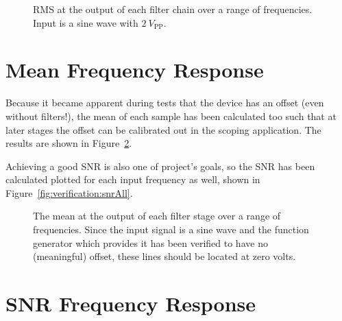 \begin{figure}
    \centering
    
    \caption[RMS at Filter Chain Output]{%
        RMS  at   the  output   of  each   filter  chain   over  a   range  of
        frequencies. Input is a sine wave with $\SI{2}{V_{\mathrm{PP}}}$.%
    }
    \label{fig:verification:rmsAll}
\end{figure}


%
%
\section{Mean Frequency Response} %
\label{sec:verification:mean}

Because it  became apparent during tests  that the device has  an offset (even
without filters!), the  mean of each sample has been  calculated too such that
at later stages  the offset can be calibrated out  in the scoping application.
The results are shown in Figure~\ref{fig:verification:meanAll}.

Achieving  a  good  SNR is  also  one  of  project's  goals, so  the  SNR  has
been  calculated  plotted   for  each  input  frequency  as   well,  shown  in
Figure~\ref{fig:verification:snrAll}.

\begin{figure}
    \centering
    
    \caption[Mean at Filter Outputs]{%
        The  mean  at  the  output  of  each filter  stage  over  a  range  of
        frequencies.  Since the  input signal is a sine wave  and the function
        generator which provides it has  been verified to have no (meaningful)
        offset, these lines should be located at zero volts.%
    }
    \label{fig:verification:meanAll}
\end{figure}
%
%
\section{SNR Frequency Response}%
\label{sec:verification:snr}

